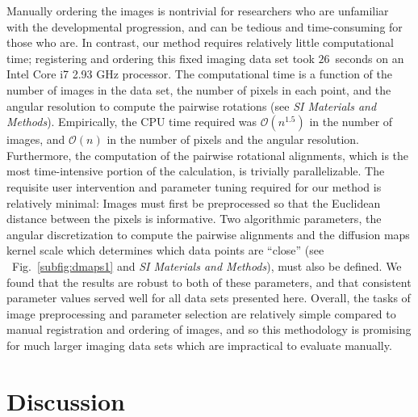 \documentclass{pnastwo}
\newcommand{\SI}[0]{{\it SI Materials and Methods}}
\newcommand{\fig}[0]{Fig.}
\begin{document}
\begin{article}
Manually ordering the images is nontrivial for researchers who are unfamiliar with the developmental progression, and can be tedious and time-consuming for those who are.
%
In contrast, our method requires relatively little computational time; registering and ordering this fixed imaging data set took $26$~seconds on an Intel Core i7 2.93 GHz processor. %
%
The computational time is a function of the number of images in the data set, the number of pixels in each point, and the angular resolution to compute the pairwise rotations (see \SI). 
%
Empirically, the CPU time required was $\mathcal{O}(n^{1.5})$ in the number of images, and $\mathcal{O}(n)$ in the number of pixels and the angular resolution.
%
Furthermore, the computation of the pairwise rotational alignments, which is the most time-intensive portion of the calculation, is trivially parallelizable.
%
The requisite user intervention and parameter tuning required for our method is relatively minimal: Images must first be preprocessed so that the Euclidean distance between the pixels is informative.
%
Two algorithmic parameters, the angular discretization to compute the pairwise alignments and the diffusion maps kernel scale which determines which data points are ``close'' (see ~\fig~\ref{subfig:dmaps1} and \SI), must also be defined.
%
We found that the results are robust to both of these parameters, and that consistent parameter values served well for all data sets presented here. 
%
%
Overall, the tasks of image preprocessing and parameter selection are relatively simple compared to manual registration and ordering of images, and so this methodology is promising for much larger imaging data sets which are impractical to evaluate manually. 


\section{Discussion}


\end{article}
\end{document}
